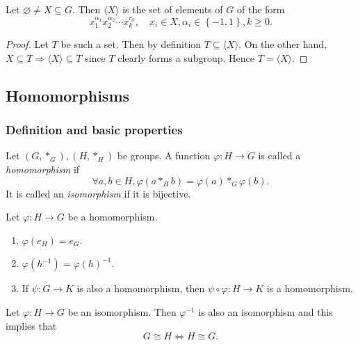 \documentclass[a4paper]{article}
\begin{document}
\begin{proposition}\label{prop:generation_of_groups}
  Let $ \varnothing \neq X \subseteq G $. Then $ \langle X \rangle $
  is the set of elements of $ G $ of the form
  \[
    x_1^{\alpha_1}x_2^{\alpha_2}\cdots x_k^{r_k},\quad x_i\in X,
    \alpha_i\in \left\{ -1,1\right\}, k\ge 0
  .\]
\end{proposition}
\begin{proof}
  Let $T$ be such a set. Then by definition $ T \subseteq \langle X
  \rangle $. On the other hand, $ X \subseteq T \Rightarrow \langle X
  \rangle  \subseteq T$ since $T$ clearly forms a subgroup. Hence $
  T=\langle X \rangle $.
\end{proof}
\subsection{Homomorphisms}
\subsubsection{Definition and basic properties}
\begin{definition}
  Let $ (G,*_G), (H,*_H) $ be groups. A function $ \varphi: H \to G $
  is called a \textit{homomorphism} if
  \[
    \forall a,b\in H, \varphi (a*_Hb)=\varphi (a)*_G \varphi (b)
  .\]
  It is called an \textit{isomorphism} if it is bijective.
\end{definition}
\begin{proposition}\label{prop:homom}
  Let $ \varphi :H\to G $ be a homomorphism.
  \begin{enumerate}[(1)]
    \item $ \varphi (e_H)=e_G $.
    \item $ \varphi (h^{-1})=\varphi (h)^{-1} $.
    \item If $ \psi:G\to K $ is also a homomorphism, then $ \psi\circ
      \varphi :H\to K $ is a homomorphism.
  \end{enumerate}
\end{proposition}
\begin{proposition}\label{prop:isom_inverse_is_also_an_isom}
  Let $ \varphi :H\to G $ be an isomorphism. Then $ \varphi^{-1} $ is
  also an isomorphism and this implies that
  \[
    G \cong H \Longleftrightarrow H \cong G
  .\]
\end{proposition}
\end{document}

